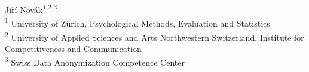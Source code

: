 \documentclass[a0,portrait]{a0poster}
\begin{document}
\begin{minipage}[b][][t]{.6\linewidth}
\vfill
\makeatletter
\raggedright{\fontsize{92pt}{100pt}\selectfont\color{uzhblau100}\textbf{{\@title}}\par}
\makeatother
\color{Black}
\vspace{1cm}


\underline{Jiří Novák\textsuperscript{1,2,3}} \\
\vspace{0.2cm}
\textsuperscript{1} University of Zürich, Psychological Methods, Evaluation and Statistics \\
\textsuperscript{2} University of Applied Sciences and Arts Northwestern Switzerland, Institute for Competitiveness and Communication \\
\textsuperscript{3} Swiss Data Anonymization Competence Center
\end{minipage}
%
\end{document}
